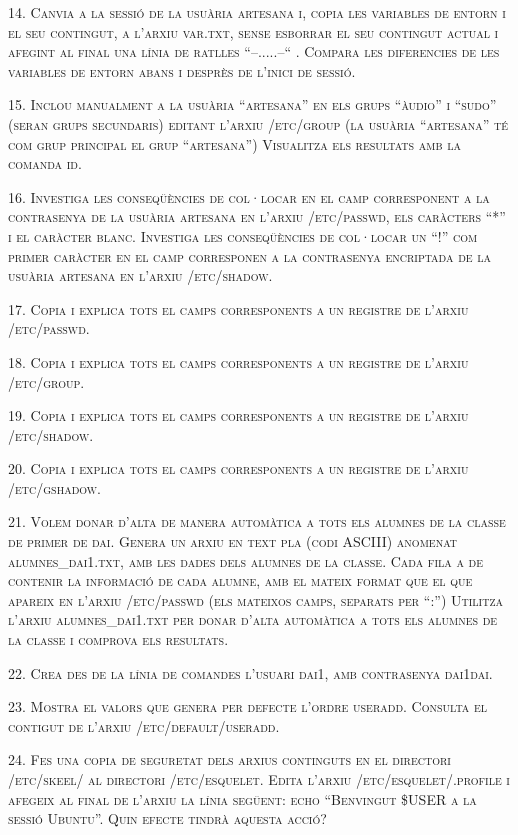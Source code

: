 \documentclass[a4paper,12pt]{article}
\begin{document}
\textsc{14.  Canvia a la sessió de la usuària artesana i, copia les variables de entorn i el seu contingut, a l’arxiu var.txt, sense esborrar el seu contingut actual i afegint al final una línia de ratlles “--.....--“ . Compara les diferencies de les variables de entorn abans i desprès de l’inici de sessió.}

\textsc{15.  Inclou manualment a la usuària “artesana” en els grups “àudio” i  “sudo” (seran grups secundaris) editant  l’arxiu /etc/group (la usuària “artesana” té com grup principal el grup “artesana”) Visualitza els resultats amb la comanda id.}

\textsc{16. Investiga les conseqüències de col·locar en el camp corresponent a la contrasenya de la usuària artesana en l’arxiu /etc/passwd, els caràcters “*” i el caràcter blanc. Investiga les conseqüències de col·locar un “!” com primer caràcter en el camp corresponen a la contrasenya encriptada de la usuària artesana en l’arxiu /etc/shadow.}

\textsc{17. Copia i explica tots el camps corresponents a un registre de l’arxiu /etc/passwd.}

\textsc{18. Copia i explica tots el camps corresponents a un registre de l’arxiu /etc/group.}

\textsc{19. Copia i explica tots el camps corresponents a un registre de l’arxiu /etc/shadow.}

\textsc{20. Copia i explica tots el camps corresponents a un registre de l’arxiu  /etc/gshadow.}

\textsc{21. Volem donar d’alta de manera automàtica a tots els alumnes de la classe de primer de dai. Genera un arxiu en text pla (codi ASCIII) anomenat alumnes\_dai1.txt, amb les dades dels alumnes de la classe. Cada fila a de contenir la informació de cada alumne, amb el mateix format que el que apareix en l’arxiu /etc/passwd (els mateixos camps, separats per “:”) Utilitza l’arxiu alumnes\_dai1.txt per donar d’alta automàtica a tots els alumnes de la classe i comprova els resultats.}

\textsc{22. Crea des de la línia de comandes l’usuari dai1, amb contrasenya dai1dai. }

\textsc{23. Mostra el valors que genera per defecte l’ordre useradd. Consulta el contigut de l’arxiu /etc/default/useradd. }

\textsc{24. Fes una copia de seguretat dels arxius continguts en el directori /etc/skeel/ al directori /etc/esquelet. Edita l’arxiu /etc/esquelet/.profile i afegeix al final de l’arxiu la línia següent: echo “Benvingut \$USER a la sessió Ubuntu”. Quin efecte tindrà aquesta acció?}
\end{document}
